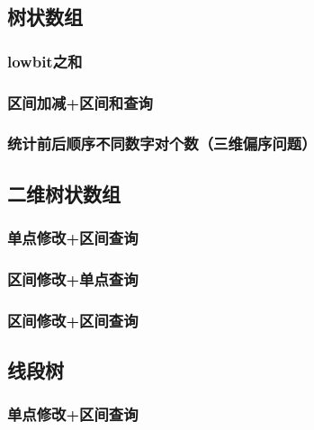 \documentclass[landscape,twocolumn,twoside,a4paper]{article}
\begin{document}
\subsection{树状数组}

\subsubsection{lowbit之和}


\subsubsection{区间加减+区间和查询}


\subsubsection{统计前后顺序不同数字对个数（三维偏序问题）}



\subsection{二维树状数组}

\subsubsection{单点修改+区间查询}


\subsubsection{区间修改+单点查询}


\subsubsection{区间修改+区间查询}



\subsection{线段树}


\subsubsection{单点修改+区间查询}

\end{document}
